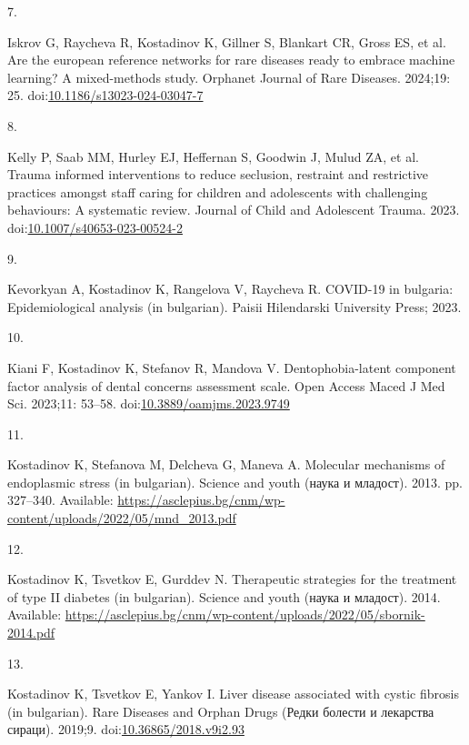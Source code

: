 \documentclass[
  12pt,
  letterpaper,
  DIV=11,
  numbers=noendperiod]{scrartcl}
\newlength{\cslhangindent}
\newlength{\csllabelwidth}
\newenvironment{CSLReferences}[2] %
 {\begin{list}{}{%
  \setlength{\itemindent}{0pt}
  \setlength{\leftmargin}{0pt}
  \setlength{\parsep}{0pt}
  \ifodd #1
   \setlength{\leftmargin}{\cslhangindent}
   \setlength{\itemindent}{-1\cslhangindent}
  \fi
  \setlength{\itemsep}{#2\baselineskip}}}
 {\end{list}}
\newcommand{\CSLLeftMargin}[1]{\parbox[t]{\csllabelwidth}{\strut#1\strut}}
\newcommand{\CSLRightInline}[1]{\parbox[t]{\linewidth - \csllabelwidth}{\strut#1\strut}}
\begin{document}
\begin{CSLReferences}{0}{1}
\CSLLeftMargin{7. }%
\CSLRightInline{Iskrov G, Raycheva R, Kostadinov K, Gillner S, Blankart
CR, Gross ES, et al. Are the european reference networks for rare
diseases ready to embrace machine learning? A mixed-methods study.
Orphanet Journal of Rare Diseases. 2024;19: 25.
doi:\href{https://doi.org/10.1186/s13023-024-03047-7}{10.1186/s13023-024-03047-7}}

\CSLLeftMargin{8. }%
\CSLRightInline{Kelly P, Saab MM, Hurley EJ, Heffernan S, Goodwin J,
Mulud ZA, et al. Trauma informed interventions to reduce seclusion,
restraint and restrictive practices amongst staff caring for children
and adolescents with challenging behaviours: A systematic review.
Journal of Child and Adolescent Trauma. 2023.
doi:\href{https://doi.org/10.1007/s40653-023-00524-2}{10.1007/s40653-023-00524-2}}

\CSLLeftMargin{9. }%
\CSLRightInline{Kevorkyan A, Kostadinov K, Rangelova V, Raycheva R.
COVID-19 in bulgaria: Epidemiological analysis (in bulgarian). Paisii
Hilendarski University Press; 2023. }

\CSLLeftMargin{10. }%
\CSLRightInline{Kiani F, Kostadinov K, Stefanov R, Mandova V.
Dentophobia-latent component factor analysis of dental concerns
assessment scale. Open Access Maced J Med Sci. 2023;11: 53--58.
doi:\href{https://doi.org/10.3889/oamjms.2023.9749}{10.3889/oamjms.2023.9749}}

\CSLLeftMargin{11. }%
\CSLRightInline{Kostadinov K, Stefanova M, Delcheva G, Maneva A.
Molecular mechanisms of endoplasmic stress (in bulgarian). Science and
youth (наука и младост). 2013. pp. 327--340. Available:
\url{https://asclepius.bg/cnm/wp-content/uploads/2022/05/mnd_2013.pdf}}

\CSLLeftMargin{12. }%
\CSLRightInline{Kostadinov K, Tsvetkov E, Gurddev N. Therapeutic
strategies for the treatment of type II diabetes (in bulgarian). Science
and youth (наука и младост). 2014. Available:
\url{https://asclepius.bg/cnm/wp-content/uploads/2022/05/sbornik-2014.pdf}}

\CSLLeftMargin{13. }%
\CSLRightInline{Kostadinov K, Tsvetkov E, Yankov I. Liver disease
associated with cystic fibrosis (in bulgarian). Rare Diseases and Orphan
Drugs (Редки болести и лекарства сираци). 2019;9.
doi:\href{https://doi.org/10.36865/2018.v9i2.93}{10.36865/2018.v9i2.93}}


\end{CSLReferences}
\end{document}
